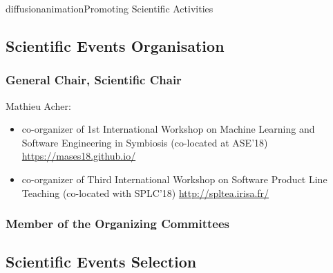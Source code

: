 \documentclass{ra2018}
\begin{document}


\begin{module}{diffusion}{animation}{Promoting Scientific Activities}



\subsection{Scientific Events Organisation}
    \subsubsection{General Chair, Scientific Chair}
    
    Mathieu Acher:
    \begin{itemize}
        \item co-organizer of 1st International Workshop on Machine Learning and Software Engineering in Symbiosis (co-located at ASE'18) \url{https://mases18.github.io/}
        \item co-organizer of Third International Workshop on Software Product Line Teaching (co-located with SPLC'18) \url{http://spltea.irisa.fr/}
    \end{itemize}
 

    \subsubsection{Member of the Organizing Committees}
    
    
\subsection {Scientific Events Selection}


\end{module}
\end{document}
